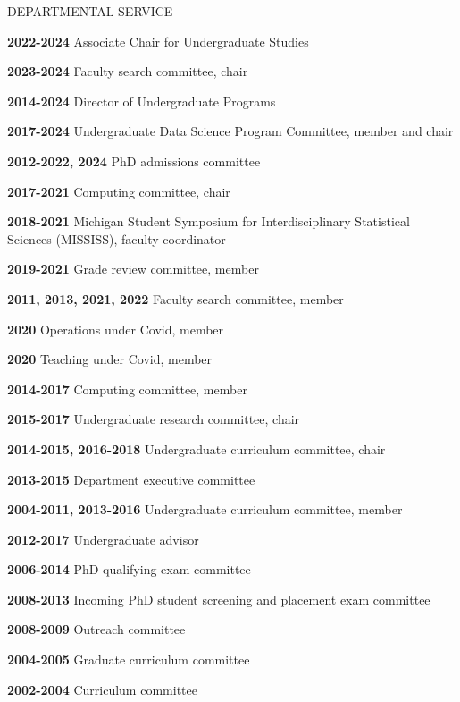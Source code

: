 
\begin{mylist}{DEPARTMENTAL SERVICE}

\item{\bf 2022-2024 } Associate Chair for Undergraduate Studies
\item{\bf 2023-2024 } Faculty search committee, chair
\item{\bf 2014-2024 } Director of Undergraduate Programs
\item{\bf 2017-2024 } Undergraduate Data Science Program Committee, member and chair
\item{\bf 2012-2022, 2024 } PhD admissions committee
\item{\bf 2017-2021 } Computing committee, chair
\item{\bf 2018-2021} Michigan Student Symposium for Interdisciplinary Statistical Sciences (MISSISS), faculty coordinator
\item{\bf 2019-2021 } Grade review committee, member  
\item{\bf 2011, 2013, 2021, 2022 } Faculty search committee, member
\item{\bf 2020 } Operations under Covid, member
\item{\bf 2020 } Teaching under Covid, member
\item{\bf 2014-2017 } Computing committee, member
\item{\bf 2015-2017 } Undergraduate research committee, chair
\item{\bf 2014-2015, 2016-2018 } Undergraduate curriculum committee, chair
\item{\bf 2013-2015 } Department executive committee
\item{\bf 2004-2011, 2013-2016 } Undergraduate curriculum committee, member
\item{\bf 2012-2017 } Undergraduate advisor
\item{\bf 2006-2014 } PhD qualifying exam committee
\item{\bf 2008-2013 } Incoming PhD student screening and placement exam committee
\item{\bf 2008-2009 } Outreach committee
\item{\bf 2004-2005 } Graduate curriculum committee
\item{\bf 2002-2004 } Curriculum committee 
\end{mylist}

\lsp

